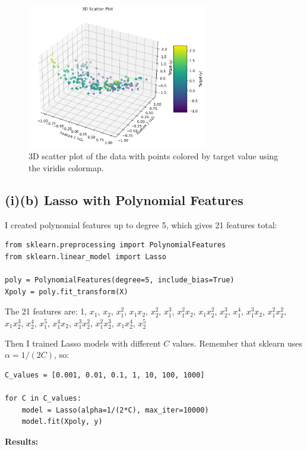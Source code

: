 \documentclass[11pt,a4paper]{article}
\begin{document}
\begin{figure}[H]
\centering
\includegraphics[width=0.7\textwidth]{figures/02_3d_scatter_plot.png}
\caption{3D scatter plot of the data with points colored by target value using the viridis colormap.}
\label{fig:3d_scatter}
\end{figure}

\subsection*{(i)(b) Lasso with Polynomial Features}

I created polynomial features up to degree 5, which gives 21 features total:

\begin{lstlisting}
from sklearn.preprocessing import PolynomialFeatures
from sklearn.linear_model import Lasso

poly = PolynomialFeatures(degree=5, include_bias=True)
Xpoly = poly.fit_transform(X)
\end{lstlisting}

The 21 features are: 1, $x_1$, $x_2$, $x_1^2$, $x_1x_2$, $x_2^2$, $x_1^3$, $x_1^2x_2$, $x_1x_2^2$, $x_2^3$, $x_1^4$, $x_1^3x_2$, $x_1^2x_2^2$, $x_1x_2^3$, $x_2^4$, $x_1^5$, $x_1^4x_2$, $x_1^3x_2^2$, $x_1^2x_2^3$, $x_1x_2^4$, $x_2^5$

Then I trained Lasso models with different $C$ values. Remember that sklearn uses $\alpha = 1/(2C)$, so:

\begin{lstlisting}
C_values = [0.001, 0.01, 0.1, 1, 10, 100, 1000]

for C in C_values:
    model = Lasso(alpha=1/(2*C), max_iter=10000)
    model.fit(Xpoly, y)
\end{lstlisting}

\textbf{Results:}
\end{document}
